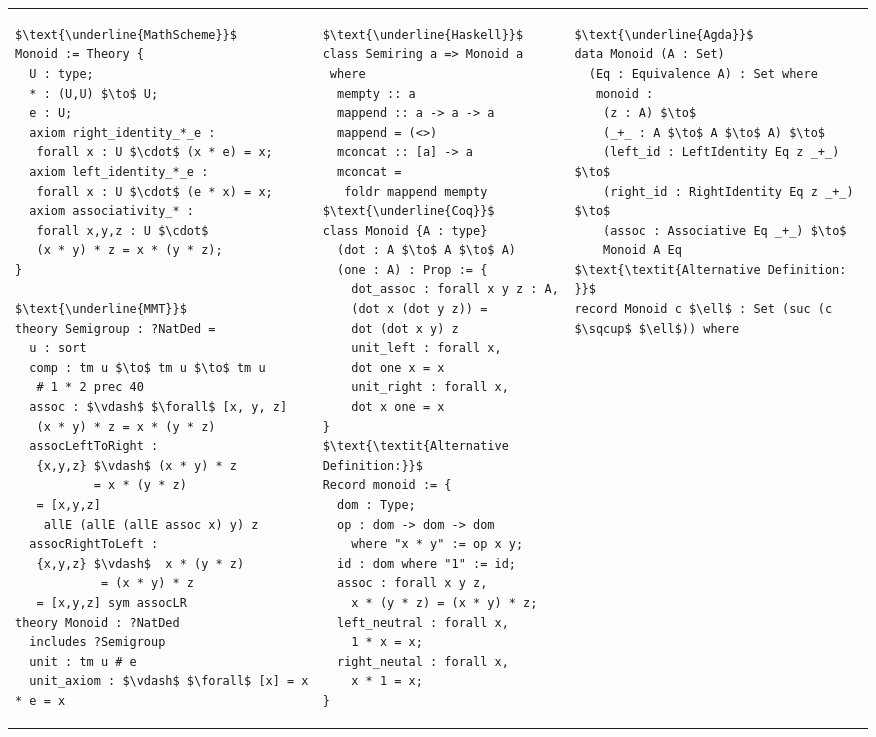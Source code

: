 \footnotesize
\begin{adjustbox}{width=1.2\columnwidth,center}
\begin{tabular}{p{7cm} p{7cm} p{7cm}}  
\begin{lstlisting}[mathescape]
$\text{\underline{MathScheme}}$
Monoid := Theory { 
  U : type; 
  * : (U,U) $\to$ U; 
  e : U; 
  axiom right_identity_*_e : 
   forall x : U $\cdot$ (x * e) = x;
  axiom left_identity_*_e :  
   forall x : U $\cdot$ (e * x) = x;
  axiom associativity_* : 
   forall x,y,z : U $\cdot$ 
   (x * y) * z = x * (y * z); 
}

$\text{\underline{MMT}}$
theory Semigroup : ?NatDed = 
  u : sort 
  comp : tm u $\to$ tm u $\to$ tm u 
   # 1 * 2 prec 40
  assoc : $\vdash$ $\forall$ [x, y, z]
   (x * y) * z = x * (y * z)    
  assocLeftToRight : 
   {x,y,z} $\vdash$ (x * y) * z 
           = x * (y * z) 
   = [x,y,z] 
    allE (allE (allE assoc x) y) z
  assocRightToLeft : 
   {x,y,z} $\vdash$  x * (y * z) 
            = (x * y) * z 
   = [x,y,z] sym assocLR 
theory Monoid : ?NatDed 
  includes ?Semigroup 
  unit : tm u # e 
  unit_axiom : $\vdash$ $\forall$ [x] = x * e = x       
\end{lstlisting}       
&
\begin{lstlisting}[mathescape]
$\text{\underline{Haskell}}$
class Semiring a => Monoid a 
 where 
  mempty :: a 
  mappend :: a -> a -> a 
  mappend = (<>) 
  mconcat :: [a] -> a 
  mconcat = 
   foldr mappend mempty 
$\text{\underline{Coq}}$
class Monoid {A : type}
  (dot : A $\to$ A $\to$ A)
  (one : A) : Prop := {
    dot_assoc : forall x y z : A, 
    (dot x (dot y z)) = 
    dot (dot x y) z
    unit_left : forall x, 
    dot one x = x 
    unit_right : forall x, 
    dot x one = x              
}
$\text{\textit{Alternative Definition:}}$
Record monoid := {
  dom : Type; 
  op : dom -> dom -> dom 
    where "x * y" := op x y; 
  id : dom where "1" := id; 
  assoc : forall x y z, 
    x * (y * z) = (x * y) * z; 
  left_neutral : forall x,   
    1 * x = x; 
  right_neutal : forall x,
    x * 1 = x; 
}
\end{lstlisting}
&
\begin{lstlisting}[mathescape]
$\text{\underline{Agda}}$
data Monoid (A : Set) 
  (Eq : Equivalence A) : Set where 
   monoid : 
    (z : A) $\to$ 
    (_+_ : A $\to$ A $\to$ A) $\to$
    (left_id : LeftIdentity Eq z _+_) $\to$ 
    (right_id : RightIdentity Eq z _+_) $\to$
    (assoc : Associative Eq _+_) $\to$
    Monoid A Eq 
$\text{\textit{Alternative Definition: }}$
record Monoid c $\ell$ : Set (suc (c $\sqcup$ $\ell$)) where 

\end{lstlisting}
\end{tabular}
\end{adjustbox}
